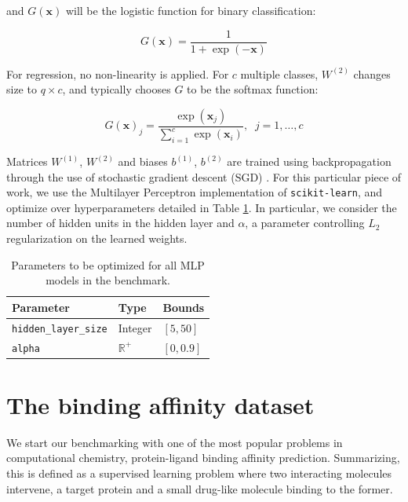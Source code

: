 \documentclass[10pt,a4paper,twoside]{book}
\begin{document}
and $G(\boldsymbol{x})$ will be the logistic function for binary classification:

\begin{equation}
G(\boldsymbol{x}) = \dfrac{1}{1 + \exp(-\boldsymbol{x})}
\end{equation} 

For regression, no non-linearity is applied. For $c$ multiple classes, $W^{(2)}$ changes size to $q \times c$, and typically chooses $G$ to be the softmax function:

\begin{equation}
G(\boldsymbol{x})_j = \dfrac{\exp(\boldsymbol{x}_j)}{\sum_{i=1}^c \exp(\boldsymbol{x}_i)}, \;\; j=1,\dots,c
\end{equation}

Matrices $W^{(1)}$, $W^{(2)}$ and biases $b^{(1)}$, $b^{(2)}$ are trained using backpropagation \cite{Rumelhart1986} through the use of stochastic gradient descent (SGD) \cite{Bottou2003}. For this particular piece of work, we use the Multilayer Perceptron implementation of \texttt{scikit-learn}, and optimize over hyperparameters detailed in Table \ref{mlpparam}. In particular, we consider the number of hidden units in the hidden layer and $\alpha$, a parameter controlling $L_2$ regularization on the learned weights.

\begin{table}[]
\centering
\caption{Parameters to be optimized for all MLP models in the benchmark.}
\label{mlpparam}
\begin{tabular}{lll}
\hline
\textbf{Parameter}             & \textbf{Type}    & \textbf{Bounds}       \\ \hline
\texttt{hidden\_layer\_size} & Integer          & $\left[5, 50\right]$  \\
\texttt{alpha}               & $\mathbb{R}^{+}$ & $\left[0, 0.9\right]$
\end{tabular}
\end{table}


\section{The binding affinity dataset}

We start our benchmarking with one of the most popular problems in computational chemistry, protein-ligand binding affinity prediction. Summarizing, this is defined as a supervised learning problem where two interacting molecules intervene, a target protein and a small drug-like molecule binding to the former.
\end{document}
